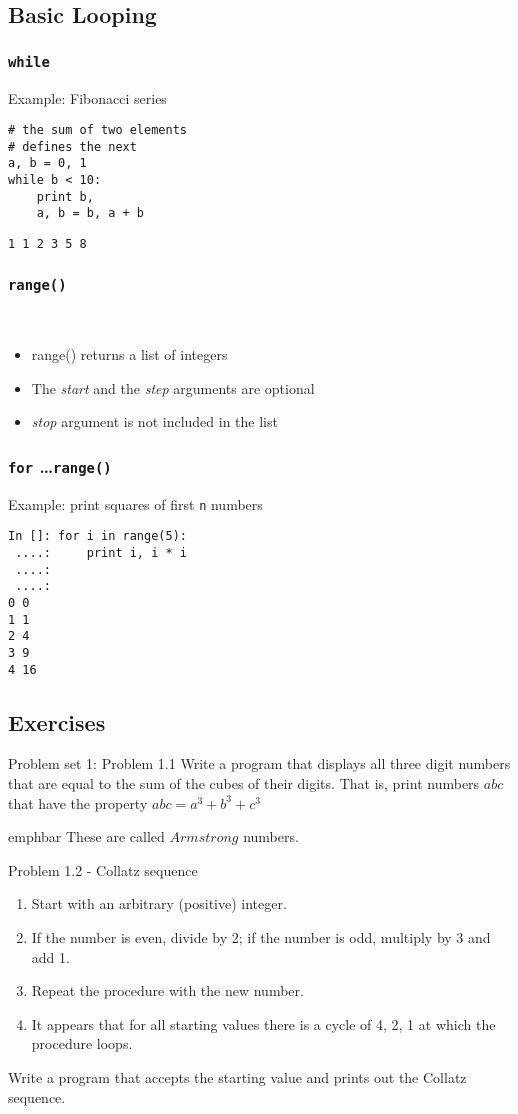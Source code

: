 \documentclass[14pt,compress]{beamer}
\newcommand{\emphbar}[1]
{\begin{beamercolorbox}[rounded=true]{emphbar} 
      {#1}
 \end{beamercolorbox}
}
\newcounter{time}
\newcommand{\inctime}[1]{\addtocounter{time}{#1}{\tiny \thetime\ m}}
\newcommand{\typ}[1]{\texttt{#1}}
\newcommand{\kwrd}[1]{ \texttt{\textbf{\color{blue}{#1}}}  }
\begin{document}
\subsection{Basic Looping}
\begin{frame}[fragile]
  \frametitle{\typ{while}}
Example: Fibonacci series
  \begin{lstlisting}
# the sum of two elements
# defines the next
a, b = 0, 1
while b < 10:
    print b,
    a, b = b, a + b 
\end{lstlisting}
\typ{1 1 2 3 5 8}\\  
\end{frame}

\begin{frame}[fragile]
\frametitle{\typ{range()}}
\kwrd{range([start,] stop[, step])}\\
\begin{itemize}
  \item range() returns a list of integers
  \item The \emph{start} and the \emph{step} arguments are optional
  \item \emph{stop} argument is not included in the list
\end{itemize}
\end{frame}

\begin{frame}[fragile]
  \frametitle{\typ{for} \ldots \typ{range()}}
Example: print squares of first \typ{n} numbers
  \begin{lstlisting}
In []: for i in range(5):
 ....:     print i, i * i
 ....:
 ....:
0 0
1 1
2 4
3 9
4 16
\end{lstlisting}
\inctime{5}
\end{frame}

\subsection{Exercises}

\begin{frame}{Problem set 1: Problem 1.1}
  Write a program that displays all three digit numbers that are equal to the sum of the cubes of their digits. That is, print numbers $abc$ that have the property $abc = a^3 + b^3 + c^3$\\
\vspace*{0.2in}
\emphbar{These are called $Armstrong$ numbers.}
\end{frame}

\begin{frame}{Problem 1.2 - Collatz sequence}
\begin{enumerate}
  \item Start with an arbitrary (positive) integer. 
  \item If the number is even, divide by 2; if the number is odd, multiply by 3 and add 1.
  \item Repeat the procedure with the new number.
  \item It appears that for all starting values there is a cycle of 4, 2, 1 at which the procedure loops.
\end{enumerate}
    Write a program that accepts the starting value and prints out the Collatz sequence.
\end{frame}
\end{document}
